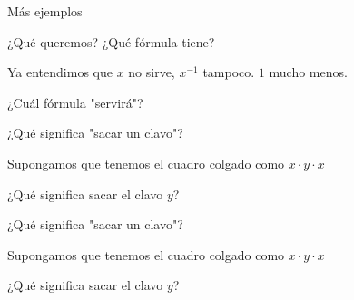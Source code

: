 \documentclass[11pt]{beamer}
\begin{document}
\begin{frame}{Más ejemplos}

\bigskip

\bigskip

\center {\textbf {  \huge{[Pizarrón]}}}








\end{frame}


\begin{frame}{¿Qué queremos? ¿Qué fórmula tiene?}

Ya entendimos que {\color{red}$x$} no sirve, {\color{red}$x^{-1}$} tampoco. {\color{red}$1$} mucho menos.


¿Cuál fórmula "servirá"?

\end{frame}


\begin{frame}{¿Qué significa "sacar un clavo"?}

Supongamos que tenemos el cuadro colgado como {\color{red}$x \cdot y \cdot x$}

¿Qué significa sacar el clavo $y$?

\bigskip


\end{frame}


\begin{frame}{¿Qué significa "sacar un clavo"?}

Supongamos que tenemos el cuadro colgado como $x \cdot y \cdot x$

¿Qué significa sacar el clavo $y$?

\bigskip


\end{frame}


\end{document}
